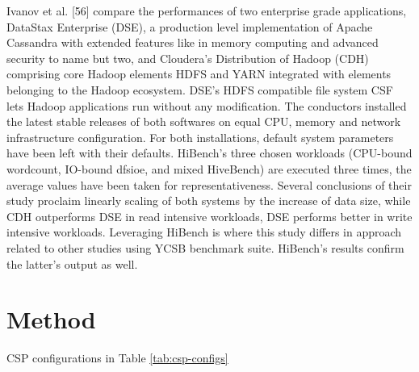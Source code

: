 \documentclass[review]{elsarticle}
\begin{document}
Ivanov et al. [56] compare the performances of two enterprise grade applications, DataStax Enterprise (DSE), a production level implementation of Apache Cassandra with extended features like in memory computing and advanced security to name but two, and Cloudera’s Distribution of Hadoop (CDH) comprising core Hadoop elements HDFS and YARN integrated with elements belonging to the Hadoop ecosystem. DSE’s HDFS compatible file system CSF lets Hadoop applications run without any modification. The conductors installed the latest stable releases of both softwares on equal CPU, memory and network infrastructure configuration. For both installations, default system parameters have been left with their defaults. HiBench’s three chosen workloads (CPU-bound wordcount, IO-bound dfsioe, and mixed HiveBench) are executed three times, the average values have been taken for representativeness. Several conclusions of their study proclaim linearly scaling of both systems by the increase of data size, while CDH outperforms DSE in read intensive workloads, DSE performs better in write intensive workloads. Leveraging HiBench is where this study differs in approach related to other studies using YCSB benchmark suite. HiBench’s results confirm the latter’s output as well.




\section{Method}
CSP configurations in Table \ref{tab:csp-configs}
\end{document}
